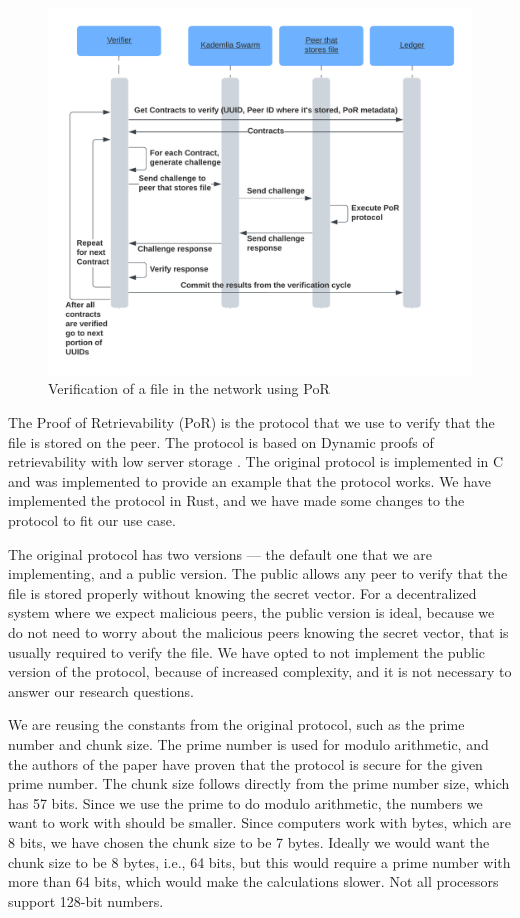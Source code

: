 \begin{figure}
    \centering
    \includegraphics[width=1\textwidth]{gfx/verify.png}
    \caption{Verification of a file in the network using PoR}
    \label{fig:verify}
\end{figure}

The Proof of Retrievability (PoR) is the protocol that we use to verify that the file is stored on the peer.
The protocol is based on Dynamic proofs of retrievability with low server storage \cite{poralgebra}.
The original protocol is implemented in C and was implemented to provide an example that the protocol works.
We have implemented the protocol in Rust, and we have made some changes to the protocol to fit our use case.

The original protocol has two versions --- the default one that we are implementing, and a public version.
The public allows any peer to verify that the file is stored properly without knowing the secret vector.
For a decentralized system where we expect malicious peers, the public version is ideal,
because we do not need to worry about the malicious peers knowing the secret vector,
that is usually required to verify the file.
We have opted to not implement the public version of the protocol,
because of increased complexity, and it is not necessary to answer our research questions.

We are reusing the constants from the original protocol,
such as the prime number and chunk size.
The prime number is used for modulo arithmetic, and the authors of the paper have proven
that the protocol is secure for the given prime number.
The chunk size follows directly from the prime number size, which has 57 bits.
Since we use the prime to do modulo arithmetic, the numbers we want to work with
should be smaller.
Since computers work with bytes, which are 8 bits, we have chosen the chunk size to be 7 bytes.
Ideally we would want the chunk size to be 8 bytes, i.e., 64 bits, but this would require a prime number
with more than 64 bits, which would make the calculations slower.
Not all processors support 128-bit numbers.

